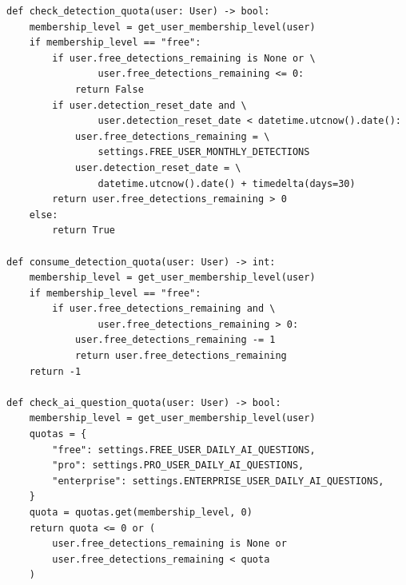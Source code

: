\documentclass[a4paper,10pt]{article}
\begin{document}
\begin{lstlisting}
def check_detection_quota(user: User) -> bool:
    membership_level = get_user_membership_level(user)
    if membership_level == "free":
        if user.free_detections_remaining is None or \
                user.free_detections_remaining <= 0:
            return False
        if user.detection_reset_date and \
                user.detection_reset_date < datetime.utcnow().date():
            user.free_detections_remaining = \
                settings.FREE_USER_MONTHLY_DETECTIONS
            user.detection_reset_date = \
                datetime.utcnow().date() + timedelta(days=30)
        return user.free_detections_remaining > 0
    else:
        return True

def consume_detection_quota(user: User) -> int:
    membership_level = get_user_membership_level(user)
    if membership_level == "free":
        if user.free_detections_remaining and \
                user.free_detections_remaining > 0:
            user.free_detections_remaining -= 1
            return user.free_detections_remaining
    return -1

def check_ai_question_quota(user: User) -> bool:
    membership_level = get_user_membership_level(user)
    quotas = {
        "free": settings.FREE_USER_DAILY_AI_QUESTIONS,
        "pro": settings.PRO_USER_DAILY_AI_QUESTIONS,
        "enterprise": settings.ENTERPRISE_USER_DAILY_AI_QUESTIONS,
    }
    quota = quotas.get(membership_level, 0)
    return quota <= 0 or (
        user.free_detections_remaining is None or
        user.free_detections_remaining < quota
    )
\end{lstlisting}
\end{document}
